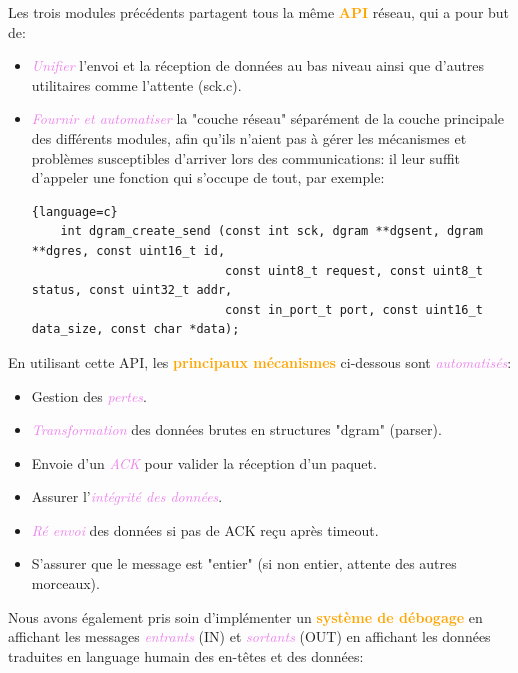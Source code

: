 \documentclass[a4paper]{article}
\let\oldtextbf\textbf
\renewcommand{\textbf}[1]{\textcolor{orange}{\oldtextbf{#1}}}
\let\oldtextit\textit
\renewcommand{\textit}[1]{\textcolor{violet}{\oldtextit{#1}}}
\begin{document}
Les trois modules précédents partagent tous la même \textbf{API} réseau, qui a pour but de:
\begin{itemize}
    \item \textit{Unifier} l'envoi et la réception de données au bas niveau ainsi que d'autres utilitaires comme l'attente (sck.c).
    \item \textit{Fournir et automatiser} la "couche réseau" séparément de la couche principale des différents modules, afin qu'ils n'aient pas à gérer les mécanismes et problèmes susceptibles d'arriver lors des communications: il leur suffit d'appeler une fonction qui s'occupe de tout, par exemple:
    \begin{lstlisting}{language=c}
    int dgram_create_send (const int sck, dgram **dgsent, dgram **dgres, const uint16_t id,
                           const uint8_t request, const uint8_t status, const uint32_t addr,
                           const in_port_t port, const uint16_t data_size, const char *data);
    \end{lstlisting}
\end{itemize}

En utilisant cette API, les \textbf{principaux mécanismes} ci-dessous sont \textit{automatisés}:
\begin{itemize}
    \item Gestion des \textit{pertes}.
    \item \textit{Transformation} des données brutes en structures "dgram" (parser).
    \item Envoie d'un \textit{ACK} pour valider la réception d'un paquet.
    \item Assurer l'\textit{intégrité des données}.
    \item \textit{Ré envoi} des données si pas de ACK reçu après timeout.
    \item S'assurer que le message est "entier" (si non entier, attente des autres morceaux).
\end{itemize}

\newpage
Nous avons également pris soin d'implémenter un \textbf{système de débogage} en affichant les messages \textit{entrants} (IN) et \textit{sortants} (OUT) en affichant les données traduites en language humain des en-têtes et des données:
\end{document}
